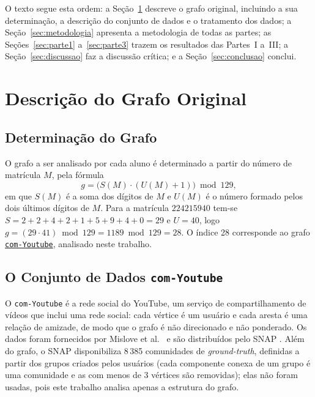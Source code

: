 \documentclass[sigconf]{webmedia}
\begin{document}
O texto segue esta ordem: a Seção~\ref{sec:grafo} descreve o grafo original, incluindo a sua determinação, a descrição do conjunto de dados e o tratamento dos dados; a Seção~\ref{sec:metodologia} apresenta a metodologia de todas as partes; as Seções~\ref{sec:parte1} a~\ref{sec:parte3} trazem os resultados das Partes~I a~III; a Seção~\ref{sec:discussao} faz a discussão crítica; e a Seção~\ref{sec:conclusao} conclui.

\section{Descrição do Grafo Original}
\label{sec:grafo}

\subsection{Determinação do Grafo}
\label{sec:determinacao}
O grafo a ser analisado por cada aluno é determinado a partir do número de matrícula $M$, pela fórmula
\begin{equation}
  g = \bigl(S(M)\cdot(U(M)+1)\bigr) \bmod 129,
\end{equation}
em que $S(M)$ é a soma dos dígitos de $M$ e $U(M)$ é o número formado pelos dois últimos dígitos de $M$. Para a matrícula $224215940$ tem-se $S=2+2+4+2+1+5+9+4+0=29$ e $U=40$, logo $g=(29\cdot 41)\bmod 129=1189\bmod 129=28$. O índice 28 corresponde ao grafo \href{https://snap.stanford.edu/data/com-Youtube.html}{\texttt{com-Youtube}}, analisado neste trabalho.

\subsection{O Conjunto de Dados \texttt{com-Youtube}}
\label{sec:conjunto}
O \texttt{com-Youtube} é a rede social do YouTube, um serviço de compartilhamento de vídeos que inclui uma rede social: cada vértice é um usuário e cada aresta é uma relação de amizade, de modo que o grafo é não direcionado e não ponderado. Os dados foram fornecidos por Mislove et al.\ \cite{mislove2007} e são distribuídos pelo SNAP \cite{snapnets,yang2015defining}. Além do grafo, o SNAP disponibiliza 8\,385 comunidades de \emph{ground-truth}, definidas a partir dos grupos criados pelos usuários (cada componente conexa de um grupo é uma comunidade e as com menos de 3 vértices são removidas); elas não foram usadas, pois este trabalho analisa apenas a estrutura do grafo.
\end{document}
